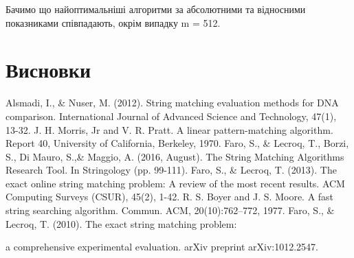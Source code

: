 \documentclass[a4paper,14pt]{extarticle} %
\begin{document}
					Бачимо що найоптимальніші алгоритми за абсолютними та відносними показниками співпадають, окрім випадку m = 512.
					
	\newpage
    \section{Висновки}

    \newpage
    
    \begin{thebibliography}{9}
		Alsmadi, I., \& Nuser, M. (2012). String matching evaluation methods for DNA comparison. International Journal of Advanced Science and Technology, 47(1), 13-32.
		J. H. Morris, Jr and V. R. Pratt. A linear pattern-matching algorithm. Report 40, University of California, Berkeley, 1970.
		Faro, S., \& Lecroq, T., Borzi, S., Di Mauro, S.,\& Maggio, A. (2016, August). The String Matching Algorithms Research Tool. In Stringology (pp. 99-111).
		Faro, S., \& Lecroq, T. (2013). The exact online string matching problem: A review of the most recent results. ACM Computing Surveys (CSUR), 45(2), 1-42.
		R. S. Boyer and J. S. Moore. A fast string searching algorithm. Commun.
ACM, 20(10):762–772, 1977.
		Faro, S., \& Lecroq, T. (2010). The exact string matching problem:
		
		a comprehensive experimental evaluation. arXiv preprint arXiv:1012.2547.
    \end{thebibliography}
    
\end{document}
